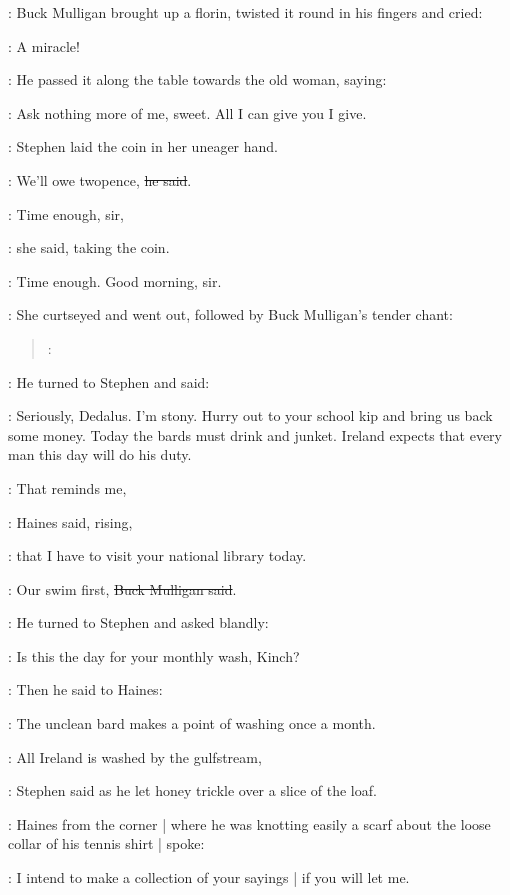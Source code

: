 :
Buck Mulligan brought up a florin,
twisted it round in his fingers
and cried:

\Mulligan:
A miracle!

:
He passed it along the table towards the old woman, saying:

\Mulligan:
Ask nothing more of me, sweet.
All I can give you I give.

:
Stephen laid the coin in her uneager hand.

\Stephen:
We'll owe twopence,
\sout{he said}.

\OldWoman:
Time enough, sir,

:
she said, taking the coin.

\OldWoman:
Time enough.
Good morning, sir.

:
She curtseyed and went out,
followed by Buck Mulligan's tender chant:

\begin{verse}
\Mulligan:
\end{verse}

:
He turned to Stephen and said:

\Mulligan:
Seriously, Dedalus.
I'm stony.
Hurry out to your school kip
and bring us back some money.
Today the bards must drink and junket.
Ireland expects that every man
this day will do his duty.

\Haines:
That reminds me,

:
Haines said, rising,

\Haines:
that I have to visit your national library today.

\Mulligan:
Our swim first,
\sout{Buck Mulligan said}.

:
He turned to Stephen and asked blandly:

\Mulligan:
Is this the day for your monthly wash, Kinch?

:
Then he said to Haines:

\Mulligan:
The unclean bard makes a point of washing once a month.

\Stephen:
All Ireland is washed by the gulfstream,

:
Stephen said as he let honey trickle over a slice of the loaf.

:
Haines from the corner |
where he was knotting easily a scarf about the loose collar of his tennis shirt |
spoke:

\Haines:
I intend to make a collection of your sayings |
if you will let me.

